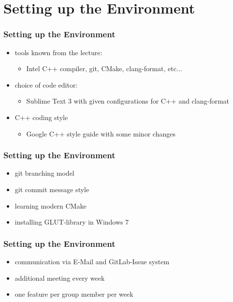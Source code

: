 \documentclass[aspectratio=169]{beamer}
\begin{document}
  \section{Setting up the Environment} %
  \label{sec:setting_up_the_environment}
  \begin{frame}
    \frametitle{Setting up the Environment}
    \begin{itemize}
    \setlength\itemsep{1.5em}
      \item tools known from the lecture:
      \begin{itemize}
        \item Intel C++ compiler, git, CMake, clang-format, etc...
      \end{itemize}
      \item choice of code editor:
      \begin{itemize}
        \item Sublime Text 3 with given configurations for C++ and clang-format
      \end{itemize}
      \item C++ coding style
      \begin{itemize}
        \item Google C++ style guide with some minor changes
      \end{itemize}
    \end{itemize}
  \end{frame}
  \begin{frame}
    \frametitle{Setting up the Environment}
    \begin{itemize}
    \setlength\itemsep{1.1em}
      \item git branching model
      \item git commit message style
      \item learning modern CMake
      \item installing GLUT-library in Windows 7
    \end{itemize}
  \end{frame}
  \begin{frame}
    \frametitle{Setting up the Environment}
    \begin{itemize}
    \setlength\itemsep{1.1em}
      \item communication via E-Mail and GitLab-Issue system
      \item additional meeting every week
      \item one feature per group member per week
    \end{itemize}
  \end{frame}
\end{document}
